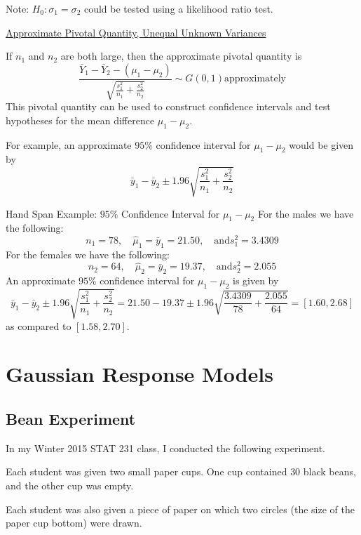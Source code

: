 \documentclass[oneside]{book}
\begin{document}
Note: $ H_0:\sigma_1=\sigma_2 $ could be tested using a likelihood ratio test.

\underline{Approximate Pivotal Quantity, Unequal Unknown Variances}

If $ n_1 $ and $ n_2 $ are both large, then the approximate pivotal quantity is
\[\frac{\bar{Y}_{1}-\bar{Y}_{2}-\left(\mu_{1}-\mu_{2}\right)}{\sqrt{\frac{s_{1}^{2}}{n_{1}}+\frac{s_{2}^{2}}{n_{2}}}} \sim G(0,1) \text{approximately}\]
This pivotal quantity can be used to construct confidence intervals and test hypotheses for the
mean difference $ \mu_1-\mu_2 $.


\begin{Example}{}{}
    For example, an approximate $ 95\% $ confidence interval for $ \mu_1-\mu_2 $ would be given
    by
    \[\bar{y}_{1}-\bar{y}_{2} \pm 1.96 \sqrt{\frac{s_{1}^{2}}{n_{1}}+\frac{s_{2}^{2}}{n_{2}}}\]
\end{Example}



\begin{Example}{Hand Span Example: $ 95\% $ Confidence Interval for $ \mu_1-\mu_2 $}{}
    For the males we have the following:
    \[n_{1}=78, \quad \hat{\mu}_{1}=\bar{y}_{1}=21.50, \quad \text{and} s_{1}^{2}=3.4309\]
    For the females we have the following:
    \[n_{2}=64, \quad \hat{\mu}_{2}=\bar{y}_{2}=19.37, \quad \text{and} s_{2}^{2}=2.055\]
    An approximate $ 95\% $ confidence interval for $ \mu_1-\mu_2 $ is given by
    \[\bar{y}_{1}-\bar{y}_{2} \pm 1.96 \sqrt{\frac{s_{1}^{2}}{n_{1}}+\frac{s_{2}^{2}}{n_{2}}}=21.50-19.37 \pm 1.96 \sqrt{\frac{3.4309}{78}+\frac{2.055}{64}}=[1.60,2.68]\]
    as compared to $ [1.58,2.70] $.
\end{Example}


\section{Gaussian Response Models}
\subsection{Bean Experiment}
In my Winter 2015 STAT 231 class, I conducted the following experiment.

Each student was given two small paper cups. One cup contained $30$ black beans, and
the other cup was empty.

Each student was also given a piece of paper on which two circles
(the size of the paper cup bottom) were drawn.
\end{document}

